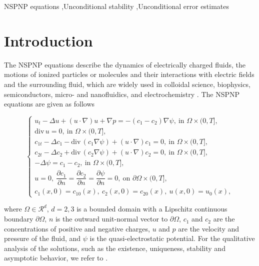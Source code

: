 \documentclass[a4paper,fleqn]{cas-sc}
\numberwithin{equation}{section}
\theoremstyle{definition}
\begin{document}
\begin{keywords}
	NSPNP equations \sep Unconditional stability \sep Unconditional error estimates
\end{keywords}

\maketitle
\thispagestyle{empty} %

\section{Introduction}
The NSPNP equations describe the dynamics of electrically charged fluids, the motions of ionized particles or molecules and their interactions with electric fields and the surrounding fluid, which are widely used in colloidal science, biophysics, semiconductors, micro- and nanofluidics, and electrochemistry \cite{Markowich1990,Kirby2010,Ramos2011,Gubbiotti2022}. The NSPNP equations are given as follows

\begin{equation}
\left\{
\begin{array}{l}
u_t - \Delta u + (u \cdot \nabla)u + \nabla p = -(c_1 - c_2)\nabla\psi, \ \text{in } \Omega \times (0,T], \\[4pt]
\text{div}\, u = 0, \ \text{in } \Omega \times (0,T], \\[4pt]
c_{1t} - \Delta c_1 - \text{div}\,(c_1\nabla\psi) + (u \cdot \nabla)c_1 = 0, \ \text{in } \Omega \times (0,T], \\[4pt]
c_{2t} - \Delta c_2 + \text{div}\,(c_2\nabla\psi) + (u \cdot \nabla)c_2 = 0, \ \text{in } \Omega \times (0,T], \\[4pt]
-\Delta\psi = c_1 - c_2, \ \text{in } \Omega \times (0,T], \\[4pt]
u = 0, \ \dfrac{\partial c_1}{\partial n} = \dfrac{\partial c_2}{\partial n} = \dfrac{\partial \psi}{\partial n} = 0, \ \text{on } \partial\Omega \times (0,T], \\[4pt]
c_1(x,0) = c_{10}(x),\ c_2(x,0) = c_{20}(x),\ u(x,0) = u_0(x),
\end{array}
\right.
\label{eq:1.1}
\end{equation}

where $\Omega \in \mathcal{R}^d$, $d = 2, 3$ is a bounded domain with a Lipschitz continuous boundary $\partial\Omega$, $n$ is the outward unit-normal vector to $\partial\Omega$, $c_1$ and $c_2$ are the concentrations of positive and negative charges, $u$ and $p$ are the velocity and pressure of the fluid, and $\psi$ is the quasi-electrostatic potential. For the qualitative analysis of the solutions, such as the existence, uniqueness, stability and asymptotic behavior, we refer to \cite{Schmuck2009,Jerome2009,Fischer2017,Bothe2014,Constantin2021,Constantin2019,Gong2021}.
\end{document}

